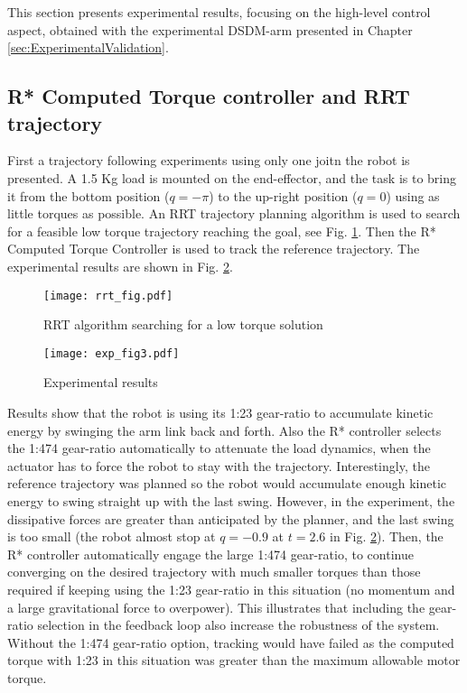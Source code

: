 This section presents experimental results, focusing on the high-level control aspect, obtained with the experimental DSDM-arm presented in Chapter \ref{sec:ExperimentalValidation}.

\subsection{R* Computed Torque controller and RRT trajectory}

First a trajectory following experiments using only one joitn the robot is presented. A 1.5 Kg load is mounted on the end-effector, and the task is to bring it from the bottom position ($q=-\pi$) to the up-right position ($q=0$) using as little torques as possible. An RRT trajectory planning algorithm is used to search for a feasible low torque trajectory reaching the goal, see Fig. \ref{fig:exp_rrt}. Then the R* Computed Torque Controller is used to track the reference trajectory. The experimental results are shown in Fig. \ref{fig:exp_traj}.
%
\begin{figure}[htp]
	\centering
		\texttt{[image: rrt\_fig.pdf]}
	\caption{RRT algorithm searching for a low torque solution}
	\label{fig:exp_rrt}
\end{figure}
%
\begin{figure}[htp]
	\centering
		\texttt{[image: exp\_fig3.pdf]}
	\caption{Experimental results}
	\label{fig:exp_traj}
	\vspace{-10pt}
\end{figure}
%
Results show that the robot is using its 1:23 gear-ratio to accumulate kinetic energy by swinging the arm link back and forth. Also the R* controller selects the 1:474 gear-ratio automatically to attenuate the load dynamics, when the actuator has to force the robot to stay with the trajectory.  Interestingly, the reference trajectory was planned so the robot would accumulate enough kinetic energy to swing straight up with the last swing. However, in the experiment, the dissipative forces are greater than anticipated by the planner, and the last swing is too small (the robot almost stop at $q=-0.9$ at $t=2.6$ in Fig. \ref{fig:exp_traj}). Then, the R* controller automatically engage the large 1:474 gear-ratio, to continue converging on the desired trajectory with much smaller torques than those required if keeping using the 1:23 gear-ratio in this situation (no momentum and a large gravitational force to overpower). This illustrates that including the gear-ratio selection in the feedback loop also increase the robustness of the system. Without the 1:474 gear-ratio option, tracking would have failed as the computed torque with 1:23 in this situation was greater than the maximum allowable motor torque.


